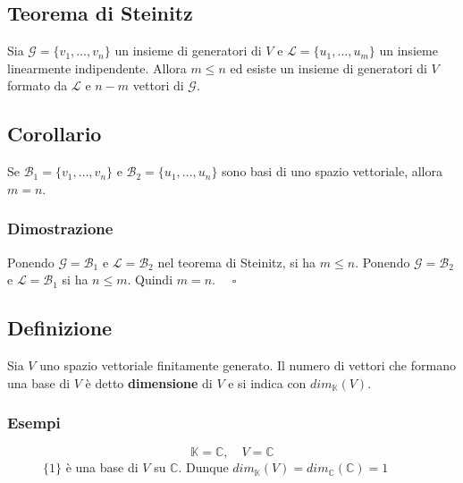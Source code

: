 \documentclass[a4paper]{article}
\theoremstyle{break}
\theoremstyle{break}
\theoremstyle{break}
\theoremstyle{break}
\begin{document}
\subsection{Teorema di Steinitz}
Sia \( \mathcal{G} = \{v_1, \ldots, v_n\}  \) un insieme di generatori di \( V \) e
\( \mathcal{L} = \{u_1, \ldots, u_m\}  \) un insieme linearmente indipendente. Allora
\( m \le n \) ed esiste un insieme di generatori di \( V \) formato da \( \mathcal{L} \) 
e \( n-m \) vettori di \( \mathcal{G} \).

\subsection{Corollario}
Se \( \mathcal{B}_1 =\{v_1, \ldots, v_n\}  \) e \( \mathcal{B}_2 = \{u_1, \ldots, u_n\}  \)
sono basi di uno spazio vettoriale, allora \( m = n \).

\subsubsection{Dimostrazione}
Ponendo \( \mathcal{G} = \mathcal{B}_1 \) e \( \mathcal{L} = \mathcal{B}_2 \) nel teorema
di Steinitz, si ha \( m \le n \). 
Ponendo \( \mathcal{G} = \mathcal{B}_2 \) e \( \mathcal{L} = \mathcal{B}_1 \) si ha
\( n \le m \). Quindi \( m = n \). \( \quad \square \)

\subsection{Definizione}
Sia \( V \) uno spazio vettoriale finitamente generato. Il numero di vettori che formano
una base di \( V \) è detto \textbf{dimensione} di \( V \) e si indica con
\( dim_\mathbb{K}(V) \). 

\subsubsection{Esempi}
\begin{figure}[H]
  \begin{example}
    \[
    \mathbb{K} = \mathbb{C}, \quad V = \mathbb{C}
    \] 
    \( \{1\} \) è una base di \( V \) su \( \mathbb{C} \). Dunque 
    \( dim_\mathbb{K}(V) = dim_{\mathbb{C}}(\mathbb{C}) = 1 \) 
  \end{example}
\end{figure}
\end{document}
